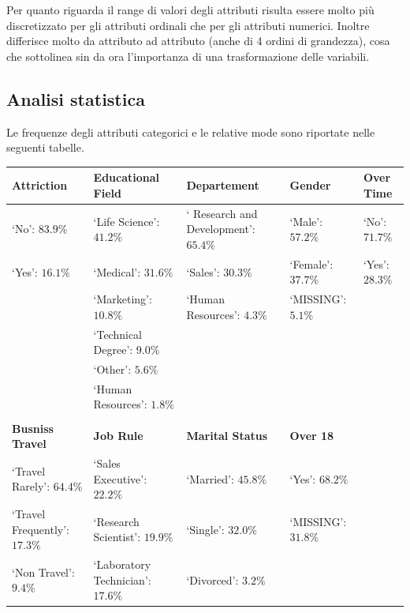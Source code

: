 \documentclass[a4paper,9pt]{article}
\begin{document}
Per quanto riguarda il range di valori degli attributi risulta essere molto più discretizzato per gli attributi ordinali che per gli attributi numerici. Inoltre differisce molto da attributo ad attributo (anche di 4 ordini di grandezza), cosa che sottolinea sin da  ora l'importanza di una trasformazione delle variabili.

\subsection{Analisi statistica}
Le frequenze degli attributi categorici e le relative mode sono riportate nelle seguenti tabelle.


\begin{center}\footnotesize
\begin{tabular}{lllll}
\toprule
\bfseries Attriction &\bfseries  Educational Field & \bfseries Departement &\bfseries  Gender & \bfseries Over Time\\
\hline
\hline
\rowcolor[gray]{0.9}
`No': $83.9\%$ &`Life Science': $41.2\%$ &` Research and Development': $65.4\%$ & `Male': $57.2\%$ & `No': $71.7\%$ \\
`Yes': $16.1\%$ &`Medical': $31.6\%$ &`Sales': $30.3\%$ & `Female': $37.7\%$ & `Yes': $28.3\%$ \\
\rowcolor[gray]{0.9}
                          &`Marketing': $10.8\%$ &`Human Resources': $4.3\%$ & `MISSING': $5.1\%$ &  \\
                          &`Technical Degree': $9.0\%$ &                                   &                                 &  \\
\rowcolor[gray]{0.9}
                          &`Other': $5.6\%$ &                                   &                                 &  \\
                          &`Human Resources': $1.8\%$ &                                   &                                 &  \\
&&&&\\
\hline
\bfseries Busniss Travel &\bfseries  Job Rule& \bfseries Marital Status &\bfseries  Over 18 & \\
\hline
\hline
\rowcolor[gray]{0.9}
`Travel Rarely': $64.4\%$ &`Sales Executive': $22.2\%$ &`Married': $45.8\%$ & `Yes': $68.2\%$ &\\
`Travel Frequently': $17.3\%$ &`Research Scientist': $19.9\%$ &`Single': $32.0\%$ & `MISSING': $31.8\%$ &\\
\rowcolor[gray]{0.9}
`Non Travel': $9.4\%$ &`Laboratory Technician': $17.6\%$ &`Divorced': $3.2\%$ &       &      \\

\end{tabular}
\end{center}
\end{document}
